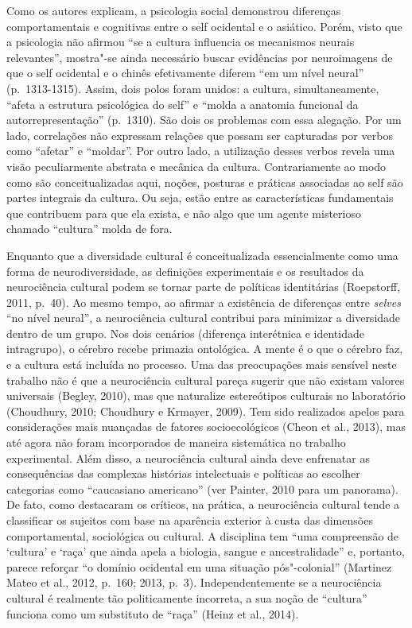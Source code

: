 Como os autores explicam, a psicologia social demonstrou diferenças
comportamentais e cognitivas entre o self ocidental e o asiático. Porém,
visto que a psicologia não afirmou ``se a cultura influencia os
mecanismos neurais relevantes'', mostra"-se ainda necessário buscar
evidências por neuroimagens de que o self ocidental e o chinês
efetivamente diferem ``em um nível neural'' (p.~1313-1315). Assim, dois
polos foram unidos: a cultura, simultaneamente, ``afeta a estrutura
psicológica do self'' e ``molda a anatomia funcional da
autorrepresentação'' (p.~1310). São dois os problemas com essa alegação.
Por um lado, correlações não expressam relações que possam ser
capturadas por verbos como ``afetar'' e ``moldar''. Por outro lado, a
utilização desses verbos revela uma visão peculiarmente abstrata e
mecânica da cultura. Contrariamente ao modo como são conceitualizadas
aqui, noções, posturas e práticas associadas ao self são partes
integrais da cultura. Ou seja, estão entre as características
fundamentais que contribuem para que ela exista, e não algo que um
agente misterioso chamado ``cultura'' molda de fora.

Enquanto que a diversidade cultural é conceitualizada essencialmente
como uma forma de neurodiversidade, as definições experimentais e os
resultados da neurociência cultural podem se tornar parte de políticas
identitárias (Roepstorff, 2011, p.~40). Ao mesmo tempo, ao afirmar a
existência de diferenças entre \emph{selves} ``no nível neural'', a
neurociência cultural contribui para minimizar a diversidade dentro de
um grupo. Nos dois cenários (diferença interétnica e identidade
intragrupo), o cérebro recebe primazia ontológica. A mente é o que o
cérebro faz, e a cultura está incluída no processo. Uma das preocupações
mais sensível neste trabalho não é que a neurociência cultural pareça
sugerir que não existam valores universais (Begley, 2010), mas que
naturalize estereótipos culturais no laboratório (Choudhury, 2010;
Choudhury e Krmayer, 2009). Tem sido realizados apelos para
considerações mais nuançadas de fatores socioecológicos (Cheon et al.,
2013), mas até agora não foram incorporados de maneira sistemática no
trabalho experimental. Além disso, a neurociência cultural ainda deve
enfrenatar as consequências das complexas histórias intelectuais e
políticas ao escolher categorias como ``caucasiano americano'' (ver
Painter, 2010 para um panorama). De fato, como destacaram os críticos,
na prática, a neurociência cultural tende a classificar os sujeitos com
base na aparência exterior à custa das dimensões comportamental,
sociológica ou cultural. A disciplina tem ``uma compreensão de `cultura'
e `raça' que ainda apela a biologia, sangue e ancestralidade'' e,
portanto, parece reforçar ``o domínio ocidental em uma situação
pós"-colonial'' (Martinez Mateo et al., 2012, p.~160; 2013, p.~3).
Independentemente se a neurociência cultural é realmente tão
politicamente incorreta, a sua noção de ``cultura'' funciona como um
substituto de ``raça'' (Heinz et al., 2014).

